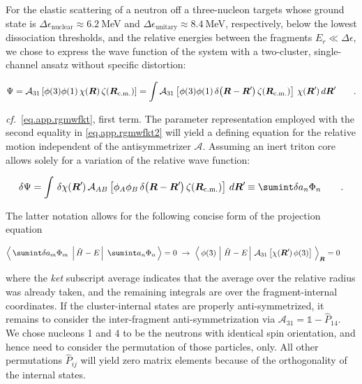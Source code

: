 \documentclass[aps,onecolumn,preprintnumbers,amsmath,amssymb,nofootinbib,superscriptaddress,notitlepage]{revtex4-1}
\newcommand{\cf}{\textit{cf.}~}
\newcommand{\ve}[1]{\ensuremath{\boldsymbol{#1}}}
\newcommand{\rcm}{\ensuremath{\ve{R}_\text{\scriptsize{c.m.}}}}
\newcommand*{\mprime}{^{\prime}\mkern-1.2mu}
\newcommand{\me}[3] {\left\langle\,#1\,\left.\left|\,#2\,\right|\right.\,#3\,\right\rangle}
\newcommand{\mer}[3] {\left\langle\,#1\,\left|\left.\,#2\,\right|\,#3\,\right.\right\rangle_{\ve{R}}}
\begin{document}
For the elastic scattering of a neutron off a three-nucleon targets whose ground state is 
$\Delta\epsilon_\text{nuclear}\approx6.2~$MeV and
$\Delta\epsilon_\text{unitary}\approx8.4~$MeV, respectively, below the lowest dissociation thresholds,
and the relative energies between the fragments $E_r\ll\Delta\epsilon$,
we chose to express the wave function of the system with a two-cluster, single-channel ansatz
without specific distortion:

\begin{equation}\label{eq.app.rgmwfkt2}
\Psi
=
\mathcal{A}_{31}\left[\phi(3)\phi(1)\,\chi(\ve{R})\,\zeta(\rcm)\right]
=
\int\mathcal{A}_{31}\left[\phi(3)\phi(1)\,\delta\big(\ve{R}-\ve{R}\mprime\big)\,\zeta(\rcm)\right]\,\chi(\ve{R}\mprime)\,d\ve{R}\mprime
\qquad.
\end{equation}

\cf\eqref{eq.app.rgmwfkt}, first term. The parameter representation employed with the second equality in \eqref{eq.app.rgmwfkt2}
will yield a defining equation for the relative motion independent of the antisymmetrizer $\mathcal{A}$.
Assuming an inert triton core allows solely for a variation of the relative wave function:

\begin{equation}\label{eq.app.rgmwfkt}
\delta\Psi
=
\int\,\delta\chi(\ve{R}\mprime)\,\mathcal{A}_{AB}\left[\phi_A\phi_B\,\delta\big(\ve{R}-\ve{R}\mprime\big)\,\zeta(\rcm)\right]\,d\ve{R}\mprime
\equiv
\sumint \delta a_n\Phi_n
\qquad.
\end{equation}

The latter notation allows for the following concise form of the projection equation

\begin{equation}\label{eq.app.rgmwfkt}
\me{\sumint \delta a_m\Phi_m}{\hat{H}-E}{ \sumint a_n\Phi_n}=0
~\to~\mer{\phi(3)}{\hat{H}-E}{\mathcal{A}_{31}\left[\chi(\ve{R}\mprime)\,\phi(3)\right]}=0
\qquad
\end{equation}

where the {\it ket} subscript average indicates that the average over the relative radius was already taken,
and the remaining integrals are over the fragment-internal coordinates. If the cluster-internal states are properly
anti-symmetrized, it remains to consider the inter-fragment anti-symmetrization via
 $\mathcal{A}_{31}=\mathbb{1}-\hat{P}_{14}$.
We chose nucleons 1 and 4 to be the neutrons with identical spin orientation, and hence need to consider the permutation of
those particles, only. All other permutations $\hat{P}_{ij}$ will yield zero matrix elements because of the orthogonality of
the internal states.
\end{document}
